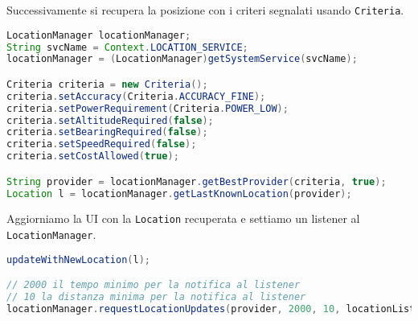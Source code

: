 Successivamente si recupera la posizione con i criteri segnalati usando \lstinline|Criteria|.

\begin{lstlisting}[language=Java]
LocationManager locationManager;
String svcName = Context.LOCATION_SERVICE;
locationManager = (LocationManager)getSystemService(svcName);

Criteria criteria = new Criteria();
criteria.setAccuracy(Criteria.ACCURACY_FINE);
criteria.setPowerRequirement(Criteria.POWER_LOW);
criteria.setAltitudeRequired(false);
criteria.setBearingRequired(false);
criteria.setSpeedRequired(false);
criteria.setCostAllowed(true);

String provider = locationManager.getBestProvider(criteria, true);
Location l = locationManager.getLastKnownLocation(provider);
\end{lstlisting}

\noindent Aggiorniamo la UI con la \lstinline|Location| recuperata e settiamo un listener al \lstinline|LocationManager|.

\begin{lstlisting}[language=Java]
updateWithNewLocation(l);

// 2000 il tempo minimo per la notifica al listener
// 10 la distanza minima per la notifica al listener
locationManager.requestLocationUpdates(provider, 2000, 10, locationListener);
\end{lstlisting}

